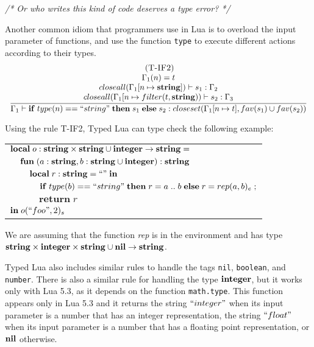 \textit{/* Or who writes this kind of code deserves a type error? */}

Another common idiom that programmers use in Lua is to overload
the input parameter of functions, and use the function \texttt{type}
to execute different actions according to their types.
\[
\begin{array}{c}
\; (\textsc{T-IF2})\\
\dfrac{\begin{array}{c}
       \Gamma_{1}(n) = t\\
       closeall(\Gamma_{1}[n \mapsto \mathbf{string}]) \vdash s_{1}:\Gamma_{2} \\
       closeall(\Gamma_{1}[n \mapsto filter(t, \mathbf{string})) \vdash s_{2}:\Gamma_{3}
      \end{array}}
      {\Gamma_{1} \vdash \mathbf{if} \; type(n) == ``string" \; \mathbf{then} \; s_{1} \; \mathbf{else} \; s_{2}:closeset(\Gamma_{1}[n \mapsto t], fav(s_{1}) \cup fav(s_{2}))}

\end{array}
\]

Using the rule \textsc{T-IF2}, Typed Lua can type check the following example:
\begin{center}
\begin{tabular}{llll}
\multicolumn{4}{l}{$\mathbf{local} \; o:\mathbf{string} \times \mathbf{string} \cup \mathbf{integer} \rightarrow \mathbf{string} =$}\\
& \multicolumn{3}{l}{$\mathbf{fun} \; (a:\mathbf{string}, b:\mathbf{string} \cup \mathbf{integer}):\mathbf{string}$}\\
& & \multicolumn{2}{l}{$\mathbf{local} \; r:\mathbf{string} = ``" \; \mathbf{in}$}\\
& & & \multicolumn{1}{l}{$\mathbf{if} \; type(b) == ``string" \; \mathbf{then} \; r = a \;{..}\;b \; \mathbf{else} \; r = rep(a, b)_{e}\; ;$}\\
& & & \multicolumn{1}{l}{$\mathbf{return} \; r$}\\
\multicolumn{4}{l}{$\mathbf{in} \; o(``foo", 2)_{s}$}
\end{tabular}
\end{center}

We are assuming that the function \emph{rep} is in the environment and has type
$\mathbf{string} \times \mathbf{integer} \times \mathbf{string} \cup \mathbf{nil} \rightarrow \mathbf{string}$.

Typed Lua also includes similar rules to handle the tags \texttt{nil},
\texttt{boolean}, and \texttt{number}.
There is also a similar rule for handling the type $\mathbf{integer}$, but
it works only with Lua 5.3, as it depends on the function \texttt{math.type}.
This function appears only in Lua 5.3 and it returns the string $``integer"$
when its input parameter is a number that has an integer representation,
the string $``float"$ when its input parameter is a number that has a
floating point representation, or $\mathbf{nil}$ otherwise.


